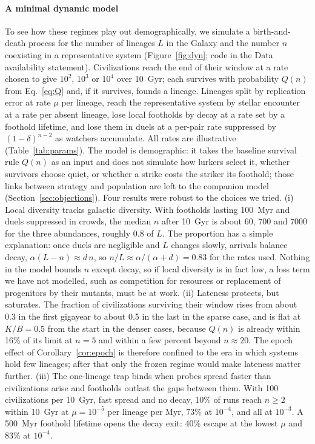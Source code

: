\documentclass[preprint,12pt]{elsarticle}
\theoremstyle{definition}
\begin{document}
\paragraph{A minimal dynamic model}
To see how these regimes play out demographically, we simulate a birth-and-death process for the number of lineages $L$ in the Galaxy and the number $n$ coexisting in a representative system (Figure~\ref{fig:dyn}; code in the Data availability statement). Civilizations reach the end of their window at a rate chosen to give $10^{2}$, $10^{3}$ or $10^{4}$ over 10~Gyr; each survives with probability $Q(n)$ from Eq.~\eqref{eq:Q} and, if it survives, founds a lineage. Lineages split by replication error at rate $\mu$ per lineage, reach the representative system by stellar encounter at a rate per absent lineage, lose local footholds by decay at a rate set by a foothold lifetime, and lose them in duels at a per-pair rate suppressed by $(1-\delta)^{n-2}$ as watchers accumulate. All rates are illustrative (Table~\ref{tab:params}). The model is demographic: it takes the baseline survival rule $Q(n)$ as an input and does not simulate how lurkers select it, whether survivors choose quiet, or whether a strike costs the striker its foothold; those links between strategy and population are left to the companion model (Section~\ref{sec:objections}). Four results were robust to the choices we tried.
(i) Local diversity tracks galactic diversity. With footholds lasting 100~Myr and duels suppressed in crowds, the median $n$ after 10~Gyr is about 60, 700 and 7000 for the three abundances, roughly 0.8 of $L$. The proportion has a simple explanation: once duels are negligible and $L$ changes slowly, arrivals balance decay, $\alpha(L - n) \approx d\,n$, so $n/L \approx \alpha/(\alpha + d) = 0.83$ for the rates used. Nothing in the model bounds $n$ except decay, so if local diversity is in fact low, a loss term we have not modelled, such as competition for resources or replacement of progenitors by their mutants, must be at work.
(ii) Lateness protects, but saturates. The fraction of civilizations surviving their window rises from about 0.3 in the first gigayear to about 0.5 in the last in the sparse case, and is flat at $K/B = 0.5$ from the start in the denser cases, because $Q(n)$ is already within 16\% of its limit at $n = 5$ and within a few percent beyond $n \approx 20$. The epoch effect of Corollary~\ref{cor:epoch} is therefore confined to the era in which systems hold few lineages; after that only the frozen regime would make lateness matter further.
(iii) The one-lineage trap binds when probes spread faster than civilizations arise and footholds outlast the gaps between them. With 100 civilizations per 10~Gyr, fast spread and no decay, 10\% of runs reach $n \geq 2$ within 10~Gyr at $\mu = 10^{-5}$ per lineage per Myr, 73\% at $10^{-4}$, and all at $10^{-3}$. A 500~Myr foothold lifetime opens the decay exit: 40\% escape at the lowest $\mu$ and 83\% at $10^{-4}$.
\end{document}
